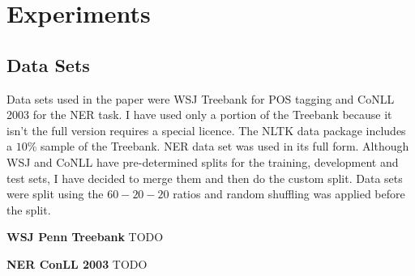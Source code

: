 \section{Experiments}

\subsection{Data Sets}
Data sets used in the paper were WSJ Treebank for POS tagging and CoNLL 2003
for the NER task. I have used only a portion of the Treebank because it isn't
the full version requires a special licence. The NLTK data package includes a
$10\%$ sample of the Treebank. NER data set was used in its full form.
Although WSJ and CoNLL have  pre-determined splits for the training,
development and test sets, I have decided to merge them and then do the custom
split. Data sets were split using the $60 - 20 - 20$ ratios and random shuffling
was applied before the split.

\textbf{WSJ Penn Treebank} TODO

\textbf{NER ConLL 2003} TODO

